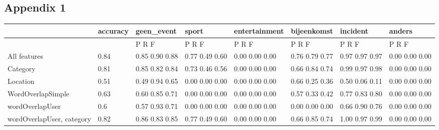 \documentclass[
10pt, %
a4paper, %
oneside, %
headinclude,footinclude, %
BCOR5mm, %
]{scrartcl}
\begin{document}
\newpage
\begin{landscape}
\section{Appendix 1}


\begin{table}[h]
 \centering
\begin{tabular}{|l|l|l|l|l|l|l|l|}
\hline
                          & accuracy & geen\_event    & sport          & entertainment  & bijeenkomst    & incident       & anders         \\ \hline
                          &          & P    R    F    & P    R    F    & P    R    F    & P    R    F    & P    R    F    & P    R    F    \\ \hline
All features              & 0.84     & 0.85 0.90 0.88 & 0.77 0.49 0.60 & 0.00 0.00 0.00 & 0.76 0.79 0.77 & 0.97 0.97 0.97 & 0.00 0.00 0.00 \\ \hline
Category                  & 0.81     & 0.85 0.82 0.84 & 0.73 0.46 0.56 & 0.00 0.00 0.00 & 0.66 0.84 0.74 & 0.99 0.97 0.98 & 0.00 0.00 0.00 \\ \hline
Location                  & 0.51     & 0.49 0.94 0.65 & 0.00 0.00 0.00 & 0.00 0.00 0.00 & 0.66 0.25 0.36 & 0.50 0.06 0.11 & 0.00 0.00 0.00 \\ \hline
WordOverlapSimple         & 0.63     & 0.60 0.85 0.71 & 0.00 0.00 0.00 & 0.00 0.00 0.00 & 0.57 0.33 0.42 & 0.77 0.83 0.80 & 0.00 0.00 0.00 \\ \hline
wordOverlapUser           & 0.6      & 0.57 0.93 0.71 & 0.00 0.00 0.00 & 0.00 0.00 0.00 & 0.00 0.00 0.00 & 0.66 0.90 0.76 & 0.00 0.00 0.00 \\ \hline
wordOverlapUser, category & 0.82     & 0.86 0.83 0.85 & 0.77 0.49 0.60 & 0.00 0.00 0.00 & 0.66 0.85 0.74 & 1.00 0.97 0.99 & 0.00 0.00 0.00 \\ \hline
\end{tabular}
\end{table}
\end{landscape}

\newpage
\end{document}

